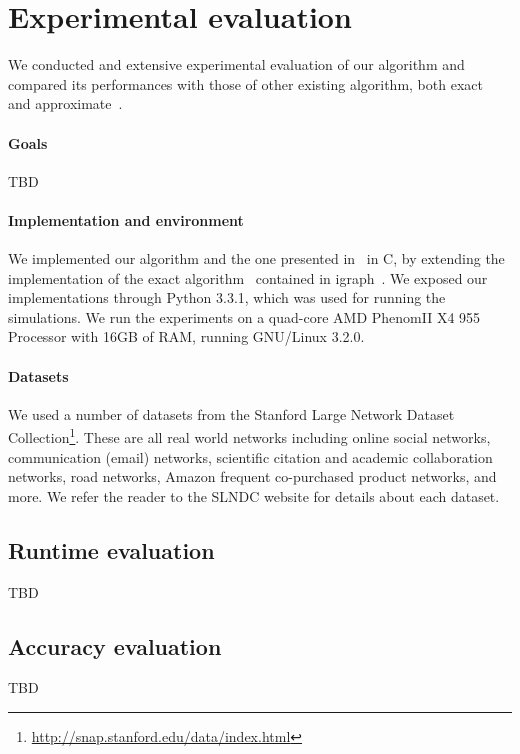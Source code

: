 \section{Experimental evaluation}\label{sec:exper}
We conducted and extensive experimental evaluation of our algorithm and
compared its performances with those of other existing algorithm, both
exact~\citep{Brandes01} and approximate~\citep{BrandesP07,JacobKLPT05}.

\paragraph{Goals} TBD

\paragraph{Implementation and environment}
We implemented our algorithm and the one presented
in~\citep{BrandesP07,JacobKLPT05} in C, by extending the implementation of the
exact algorithm~\citep{Brandes01} contained in igraph~\citep{igraph}. We
exposed our implementations through Python 3.3.1, which was used for running the
simulations. We run the experiments on a quad-core AMD Phenom\texttrademark II
X4 955 Processor with 16GB of RAM, running GNU/Linux 3.2.0.

\paragraph{Datasets} We used a number of datasets from the Stanford Large
Network Dataset
Collection\footnote{\url{http://snap.stanford.edu/data/index.html}}. These are
all real world networks including online social networks, communication (email)
networks, scientific citation and academic collaboration networks, road
networks, Amazon frequent co-purchased product networks, and more. We refer the
reader to the SLNDC website for details about each dataset.

\subsection{Runtime evaluation}\label{sec:runtime}
TBD

\subsection{Accuracy evaluation}\label{sec:accuracy}
TBD
